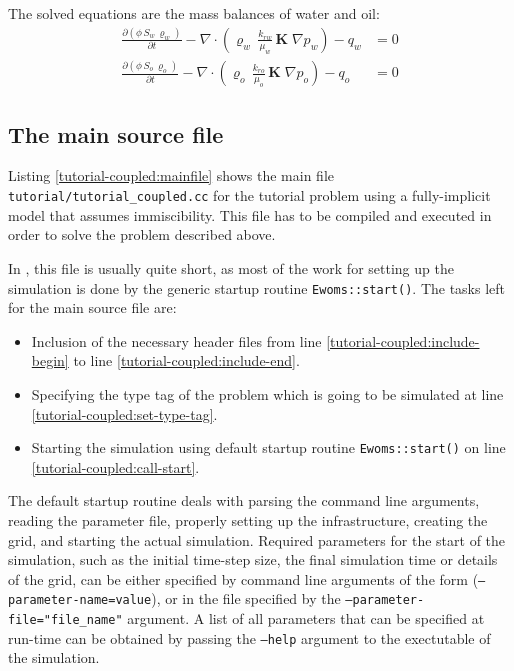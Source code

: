 The solved equations are the mass balances of water and oil:
\begin{align}
  \label{massbalancewater}
  \frac {\partial (\phi \, S_{w}\, \varrho_{w})}{\partial t}
  -
  \nabla \cdot \left( \varrho_{w} \, \frac{k_{rw}}{\mu_{w}} \, \mathbf{K}\;\nabla p_w \right)
  -
  q_w
  & =
  0 \\
  \label{massbalanceoil}
  \frac {\partial (\phi \, S_{o}\, \varrho_{o})}{\partial t}
  -
  \nabla \cdot \left( \varrho_{o} \, \frac{k_{ro}}{\mu_{o}} \, \mathbf{K}\;\nabla p_o \right)
  -
  q_o 
  & =
  0
\end{align}

\subsection{The main source file}

Listing \ref{tutorial-coupled:mainfile} shows the main file
\texttt{tutorial/tutorial\_coupled.cc} for the tutorial problem using
a fully-implicit model that assumes immiscibility. This file has to be
compiled and executed in order to solve the problem described above.

\begin{lst}\label{tutorial-coupled:mainfile} \mbox{}
  
\end{lst}

In \eWoms, this file is usually quite short, as most of the work for
setting up the simulation is done by the generic startup routine
\texttt{Ewoms::start()}. The tasks left for the main source file are:
\begin{itemize}
\item Inclusion of the necessary header files from line
  \ref{tutorial-coupled:include-begin} to line
  \ref{tutorial-coupled:include-end}.
\item Specifying the type tag of the problem which is going to be
  simulated at line \ref{tutorial-coupled:set-type-tag}.
\item Starting the simulation using default \eWoms startup routine
  \texttt{Ewoms::start()} on line \ref{tutorial-coupled:call-start}.
\end{itemize}

The default \eWoms startup routine deals with parsing the command line
arguments, reading the parameter file, properly setting up the \Dune
infrastructure, creating the grid, and starting the actual simulation.
Required parameters for the start of the simulation, such as the
initial time-step size, the final simulation time or details of the
grid, can be either specified by command line arguments of the form
(\texttt{--parameter-name=value}), or in the file specified by the
\texttt{--parameter-file="file\_name"} argument. A list of all
parameters that can be specified at run-time can be obtained by passing
the \texttt{--help} argument to the exectutable of the simulation.

